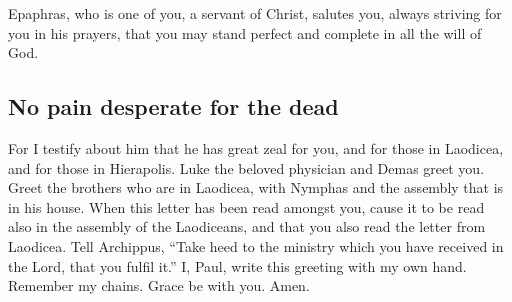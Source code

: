 Epaphras, who is one of you, a servant of Christ,
salutes you, always striving for you in his prayers, that you may stand
perfect and complete in all the will of God.

\hypertarget{no-pain-desperate-for-the-dead}{%
\subsection{No pain desperate for the
dead}\label{no-pain-desperate-for-the-dead}}

 For I testify about him that he has great zeal for you,
and for those in Laodicea, and for those in Hierapolis. 
Luke the beloved physician and Demas greet you.  Greet
the brothers who are in Laodicea, with Nymphas and the assembly that is
in his house.  When this letter has been read amongst
you, cause it to be read also in the assembly of the Laodiceans, and
that you also read the letter from Laodicea.  Tell
Archippus, ``Take heed to the ministry which you have received in the
Lord, that you fulfil it.''  I, Paul, write this greeting
with my own hand. Remember my chains. Grace be with you. Amen.
